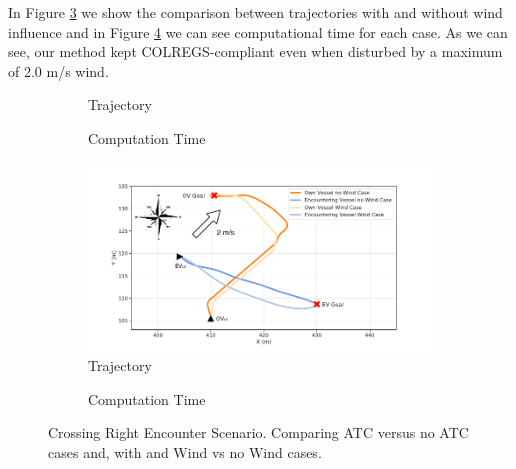         In Figure \ref{fig:plot_cl_w_vs_wind} we show the comparison between trajectories with and without wind influence and in Figure \ref{fig:plot_cl_w_vs_wind_CT} we can see computational time for each case. As we can see, our method kept COLREGS-compliant even when disturbed by a maximum of 2.0 m/s wind.
        \begin{figure}[H]
        \centering
        
            \begin{subfigure}[b]{0.49\textwidth}
                \centering
                
                \caption{Trajectory}
                \label{fig:plot_cl_w_vs_wo}
            \end{subfigure}
            \begin{subfigure}[b]{0.49\textwidth}
                \centering
                
                \caption{Computation Time}
                \label{fig:plot_cl_w_vs_wo_CT}
            \end{subfigure}
            
            \begin{subfigure}[b]{0.49\textwidth}
                \centering
                \includegraphics[width=\textwidth]{figs/Chap5/plot_cl_w_vs_wind.pdf}
                \caption{Trajectory}
                \label{fig:plot_cl_w_vs_wind}
            \end{subfigure}
            \begin{subfigure}[b]{0.49\textwidth}
                \centering
                
                \caption{Computation Time}
                \label{fig:plot_cl_w_vs_wind_CT}
            \end{subfigure}
        
        \caption{Crossing Right Encounter Scenario. Comparing \ac{ATC} versus no \ac{ATC} cases and, with and Wind vs no Wind cases.}
        \label{fig:plots_cl}
        \end{figure}
      
